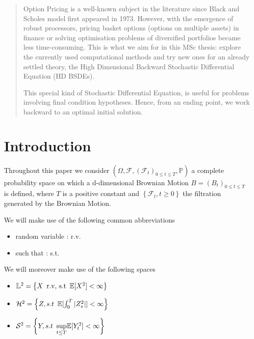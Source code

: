 \documentclass[english,11pt,openany]{report}
\theoremstyle{definition}
\newcommand{\E}{\mathbb{E}}
\theoremstyle{plain}
\theoremstyle{definition}
\begin{document}
\newpage 
\begin{abstract}

Option Pricing is a well-known subject in the literature since Black and Scholes model first appeared in 1973. However, with the emergence of robust processors, pricing basket options (options on multiple assets) in finance or solving optimisation problems of diversified portfolios became less time-consuming. This is what we aim for in this MSc thesis: explore the currently used computational methods and try new ones for an already settled theory, the High Dimensional Backward Stochastic Differential Equation (HD BSDEs).

This special kind of Stochastic Differential Equation, is useful for problems involving final condition hypotheses. Hence, from an ending point, we work backward to an optimal initial solution.
\end{abstract}

\chapter{Introduction}

Throughout this paper we consider $(\Omega, \mathcal{F}, (\mathcal{F}_t)_{0\leq t \leq T}, \mathbb{P})$ a complete probability space on which a d-dimensional Brownian Motion $B=(B_t)_{0\leq t\leq T}$ is defined, where $T$ is a positive constant and $ \left\lbrace\mathcal{F}_t, t\geq 0\right\rbrace$ the filtration generated by the Brownian Motion.

We will make use of the following common abbreviations 

\begin{itemize}
	\item random variable : r.v.
	\item such that : s.t.
\end{itemize}

We will moreover make use of the following spaces 

\begin{itemize}
	\item $\mathbb{L}^2 = \left\lbrace X \enskip \text{r.v, s.t} \enskip \E[X^2]<\infty \right\rbrace$
	\item $\mathcal{H}^2 = \left\lbrace Z, s.t \enskip \E[\int_{0}^{T}|Z_s^2|]<\infty\right\rbrace$
	\item $\mathcal{S}^2 = \left\lbrace Y, s.t \enskip \underset{t\leq T}\sup\E[Y_t^2]<\infty\right\rbrace$
\end{itemize}
\end{document}
